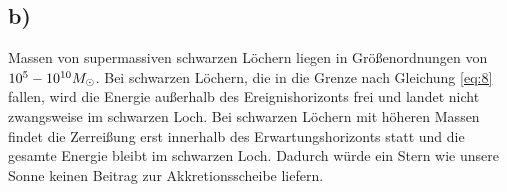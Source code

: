 \subsection{b)}
\justifying Massen von supermassiven schwarzen Löchern liegen in Größenordnungen von
$10^5\-- 10^{10} M_{\odot} $. Bei schwarzen Löchern, die in die Grenze nach Gleichung
\eqref{eq:8} fallen, wird die Energie außerhalb des Ereignishorizonts frei und
landet nicht zwangsweise im schwarzen Loch. Bei schwarzen Löchern mit höheren Massen
findet die Zerreißung erst innerhalb des Erwartungshorizonts statt und die gesamte Energie
bleibt im schwarzen Loch. Dadurch würde ein Stern wie unsere Sonne keinen Beitrag zur 
Akkretionsscheibe liefern.




